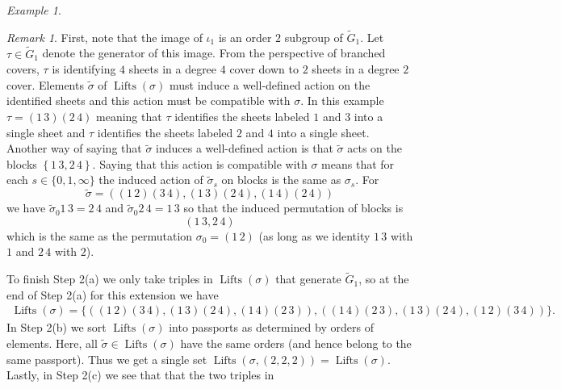 \documentclass{dcthesis}
\newcommand{\wt}[1]{\widetilde{#1}}
\DeclareMathOperator{\Lifts}{Lifts}
\theoremstyle{definition}
\theoremstyle{remark}
\newtheorem{remark}[prop]{Remark}
\newtheorem{example}[prop]{Example}
\numberwithin{equation}{section}
\numberwithin{figure}{section}
\begin{document}
{{\begin{example}
\begin{itemize}
\begin{remark}
            First, note that the image of $\iota_1$ is an order $2$ subgroup of
            $\wt{G}_1$.
            Let $\tau\in\wt{G}_1$ denote the generator of this image.
            From the perspective of branched covers,
            $\tau$ is identifying $4$ sheets in a degree $4$ cover down to $2$ sheets
            in a degree $2$ cover.
            Elements $\wt{\sigma}$ of $\Lifts(\sigma)$ must induce a well-defined action on the
            identified sheets and this action must be compatible with $\sigma$.
            In this example $\tau = (1\,3)(2\,4)$ meaning that $\tau$
            identifies the sheets labeled $1$ and $3$ into a single sheet
            and $\tau$ identifies the sheets labeled $2$ and $4$ into a single sheet.
            Another way of saying that $\wt{\sigma}$ induces a well-defined
            action is that $\wt{\sigma}$ acts on the blocks
            $\left\{\boxed{1\,3},\boxed{2\,4}\right\}$.
            Saying that this action is compatible with $\sigma$ means that for each
            $s\in\{0,1,\infty\}$ the induced action of $\wt{\sigma}_s$ on blocks
            is the same as $\sigma_s$.
            For
            \[
              \wt{\sigma} = ((1\,2)(3\,4), (1\,3)(2\,4), (1\,4)(2\,4))
            \]
            we have
            $\wt{\sigma}_0\boxed{1\,3} = \boxed{2\,4}$
            and
            $\wt{\sigma}_0\boxed{2\,4} = \boxed{1\,3}$
            so that the induced permutation of blocks is
            \[
              \left(\boxed{1\,3},\boxed{2\,4}\right)
            \]
            which is the same as the permutation $\sigma_0 = (1\,2)$
            (as long as we identity $\boxed{1\,3}$ with $1$ and $\boxed{2\,4}$ with $2$).
          \end{remark}
          To finish Step 2(a)
          we only take triples in $\Lifts(\sigma)$ that generate $\wt{G}_1$,
          so at the end of Step 2(a) for this extension we have
          \begin{align*}
            \Lifts(\sigma) =
            \Big\{
              ((1\,2)(3\,4), (1\,3)(2\,4), (1\,4)(2\,3)),
              ((1\,4)(2\,3), (1\,3)(2\,4), (1\,2)(3\,4))
            \Big\}.
          \end{align*}
          In Step 2(b) we sort $\Lifts(\sigma)$ into passports as determined by orders of elements.
          Here, all $\wt{\sigma}\in\Lifts(\sigma)$ have the same orders
          (and hence belong to the same passport).
          Thus we get a single set $\Lifts(\sigma,(2,2,2)) = \Lifts(\sigma)$.
          Lastly,
          in Step 2(c) we see that that the two triples in

\end{itemize}
\end{example}}}
\end{document}
